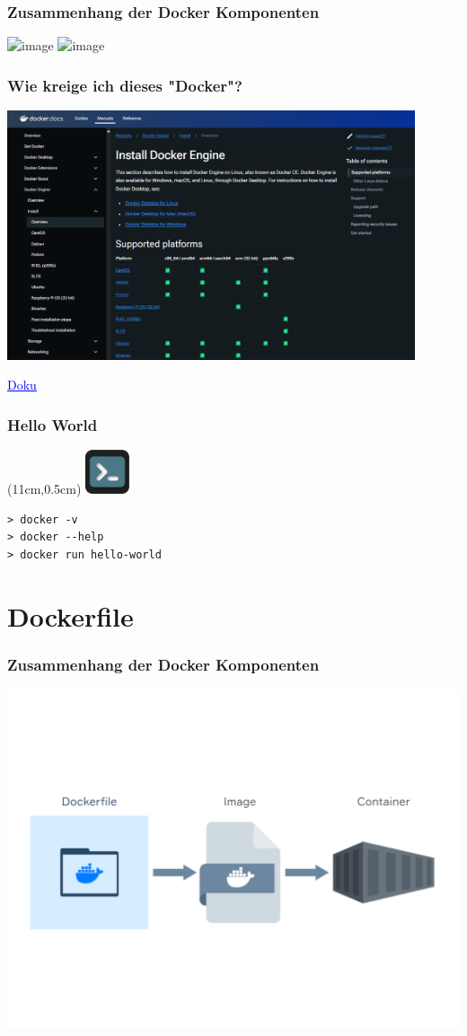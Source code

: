 \documentclass[22pt]{beamer}
\renewcommand{\href}[2]{\textcolor{blue}{\uline{#2}}}
\newcommand{\terminal}{
    \begin{textblock*}{1.3cm}(11cm,0.5cm) %
    \includegraphics[width=1.3cm]{Bilder/terminal2.png}
    \end{textblock*}
}
\begin{document}
\begin{frame}[c]
    \frametitle{Zusammenhang der Docker Komponenten}
        \includegraphics<1>[width=1\textwidth]{Bilder/Docker-Ablauf.png}
        \includegraphics<2>[width=1\textwidth]{Bilder/dockercommand.png}
\end{frame}

\begin{frame}[c]
    \frametitle{Wie kreige ich dieses "Docker"?}
    \includegraphics[width=0.9\textwidth]{Bilder/Installation.png}

    \href{https://docs.docker.com/engine/install}{Doku}
\end{frame}

\begin{frame}[fragile,t]
    \frametitle{Hello World}
    \terminal
\begin{verbatim}
> docker -v
> docker --help
> docker run hello-world
\end{verbatim}
\end{frame}

\section{Dockerfile}
\begin{frame}[c]
    \frametitle{Zusammenhang der Docker Komponenten}
    \includegraphics[width=1\textwidth]{Bilder/Docker-Ablauf_file.png}
\end{frame}
\end{document}
